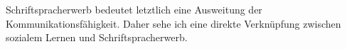 Schriftspracherwerb bedeutet letztlich eine Ausweitung der Kommunikationsfähigkeit.
Daher sehe ich eine direkte Verknüpfung zwischen sozialem Lernen und Schriftspracherwerb.